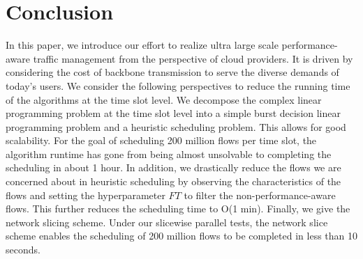 \section{Conclusion}
In this paper, we introduce our effort to realize ultra large scale performance-aware traffic management from the perspective of cloud providers. It is driven by considering the cost of backbone transmission to serve the diverse demands of today’s users. We consider the following perspectives to reduce the running time of the algorithms at the time slot level. We decompose the complex linear programming problem at the time slot level into a simple {\egress} burst decision linear programming problem and a heuristic scheduling problem. This allows {\sys} for good scalability. For the goal of scheduling 200 million flows per time slot, the algorithm runtime has gone from being almost unsolvable to completing the scheduling in about 1 hour. In addition, we drastically reduce the flows we are concerned about in heuristic scheduling by observing the characteristics of the flows and setting the hyperparameter $FT$ to filter the non-performance-aware flows. This further reduces the scheduling time to O(1 min). Finally, we give the network slicing scheme. Under our slicewise parallel tests, the network slice scheme enables the scheduling of 200 million flows to be completed in less than 10 seconds.

